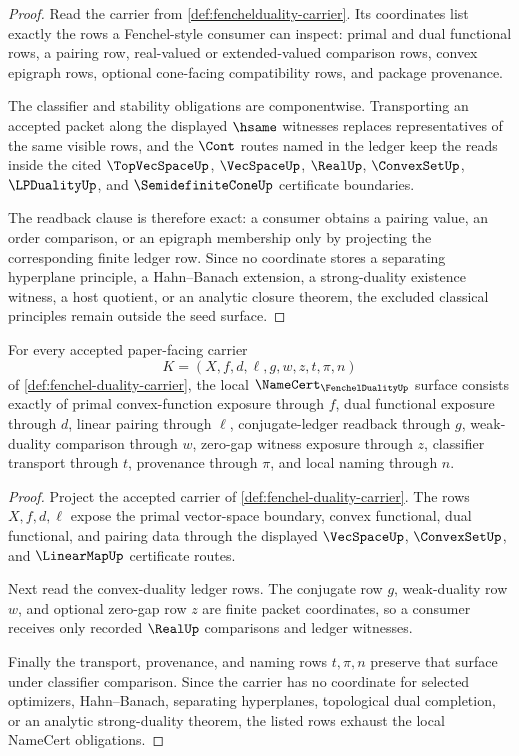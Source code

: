 \begin{proof}
Read the carrier from \autoref{def:fenchelduality-carrier}. Its coordinates list exactly the rows a Fenchel-style consumer can inspect: primal and dual functional rows, a pairing row, real-valued or extended-valued comparison rows, convex epigraph rows, optional cone-facing compatibility rows, and package provenance.

The classifier and stability obligations are componentwise. Transporting an accepted packet along the displayed $\hsame$ witnesses replaces representatives of the same visible rows, and the $\Cont$ routes named in the ledger keep the reads inside the cited $\TopVecSpaceUp$, $\VecSpaceUp$, $\RealUp$, $\ConvexSetUp$, $\LPDualityUp$, and $\SemidefiniteConeUp$ certificate boundaries.

The readback clause is therefore exact: a consumer obtains a pairing value, an order comparison, or an epigraph membership only by projecting the corresponding finite ledger row. Since no coordinate stores a separating hyperplane principle, a Hahn--Banach extension, a strong-duality existence witness, a host quotient, or an analytic closure theorem, the excluded classical principles remain outside the seed surface.
\end{proof}

\begin{theorem}
\label{thm:fenchel-duality-namecert-obligations}
For every accepted paper-facing carrier
$$
K=(X,f,d,\ell,g,w,z,t,\pi,n)
$$
of \autoref{def:fenchel-duality-carrier}, the local $\NameCert_{\FenchelDualityUp}$ surface consists exactly of primal convex-function exposure through $f$, dual functional exposure through $d$, linear pairing through $\ell$, conjugate-ledger readback through $g$, weak-duality comparison through $w$, zero-gap witness exposure through $z$, classifier transport through $t$, provenance through $\pi$, and local naming through $n$.
\end{theorem}
\begin{proof}
Project the accepted carrier of \autoref{def:fenchel-duality-carrier}. The rows $X,f,d,\ell$ expose the primal vector-space boundary, convex functional, dual functional, and pairing data through the displayed $\VecSpaceUp$, $\ConvexSetUp$, and $\LinearMapUp$ certificate routes.

Next read the convex-duality ledger rows. The conjugate row $g$, weak-duality row $w$, and optional zero-gap row $z$ are finite packet coordinates, so a consumer receives only recorded $\RealUp$ comparisons and ledger witnesses.

Finally the transport, provenance, and naming rows $t,\pi,n$ preserve that surface under classifier comparison. Since the carrier has no coordinate for selected optimizers, Hahn--Banach, separating hyperplanes, topological dual completion, or an analytic strong-duality theorem, the listed rows exhaust the local NameCert obligations.
\end{proof}

